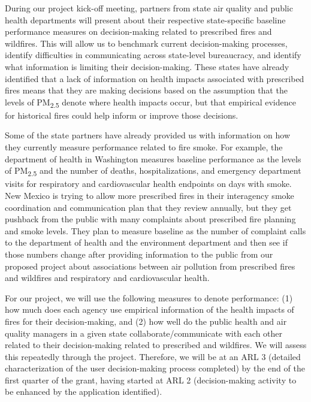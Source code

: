 \documentclass[authoryear]{elsarticle}
\begin{document}

During our project kick-off meeting, partners from state air quality and public health departments will present about their respective state-specific baseline performance measures on decision-making related to prescribed fires and wildfires. This will allow us to benchmark current decision-making processes, identify difficulties in communicating across state-level bureaucracy, and identify what information is limiting their decision-making. These states have already identified that a lack of information on health impacts associated with prescribed fires means that they are making decisions based on the assumption that the levels of PM\textsubscript{2.5} denote where health impacts occur, but that empirical evidence for historical fires could help inform or improve those decisions. 

Some of the state partners have already provided us with information on how they currently measure performance related to fire smoke. For example, the department of health in Washington measures baseline performance as the levels of PM\textsubscript{2.5} and the number of deaths, hospitalizations, and emergency department visits for respiratory and cardiovascular health endpoints on days with smoke. New Mexico is trying to allow more prescribed fires in their interagency smoke coordination and communication plan that they review annually, but they get pushback from the public with many complaints about prescribed fire planning and smoke levels. They plan to measure baseline as the number of complaint calls to the department of health and the environment department and then see if those numbers change after providing information to the public from our proposed project about associations between air pollution from prescribed fires and wildfires and respiratory and cardiovascular health. 

For our project, we will use the following measures to denote performance: (1) how much does each agency use empirical information of the health impacts of fires for their decision-making, and (2) how well do the public health and air quality managers in a given state collaborate/communicate with each other related to their decision-making related to prescribed and wildfires. We will assess this repeatedly through the project. Therefore, we will be at an ARL 3 (detailed characterization of the user decision-making process completed) by the end of the first quarter of the grant, having started at ARL 2 (decision-making activity to be enhanced by the application identified). 
\end{document}
